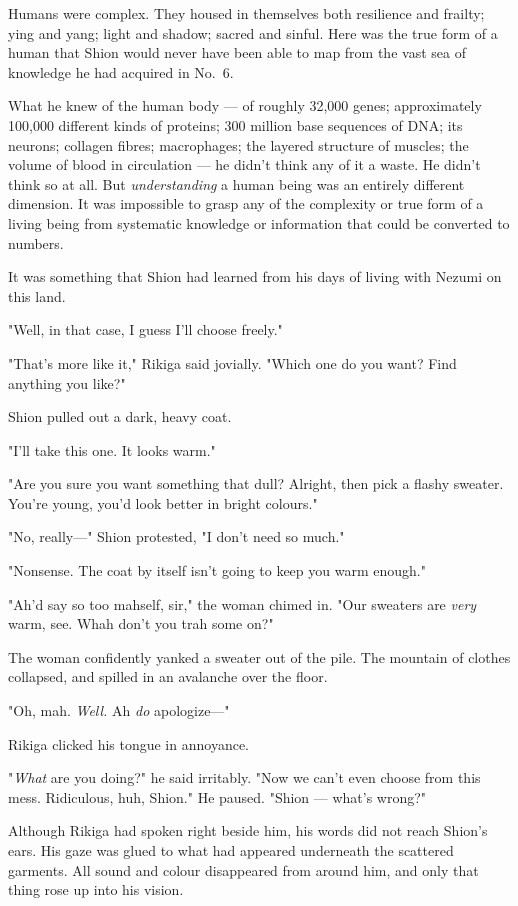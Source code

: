 Humans were complex. They housed in themselves both resilience and
frailty; ying and yang; light and shadow; sacred and sinful. Here was
the true form of a human that Shion would never have been able to map
from the vast sea of knowledge he had acquired in No.~6.

What he knew of the human body --- of roughly 32,000 genes; approximately
100,000 different kinds of proteins; 300 million base sequences of DNA;
its neurons; collagen fibres; macrophages; the layered structure of
muscles; the volume of blood in circulation --- he didn't think any of it
a waste. He didn't think so at all. But \emph{understanding} a human being was
an entirely different dimension. It was impossible to grasp any of the
complexity or true form of a living being from systematic knowledge or
information that could be converted to numbers.

It was something that Shion had learned from his days of living with
Nezumi on this land.

"Well, in that case, I guess I'll choose freely."

"That's more like it," Rikiga said jovially. "Which one do you want?
Find anything you like?"

Shion pulled out a dark, heavy coat.

"I'll take this one. It looks warm."

"Are you sure you want something that dull? Alright, then pick a flashy
sweater. You're young, you'd look better in bright colours."

"No, really---" Shion protested, "I don't need so much."

"Nonsense. The coat by itself isn't going to keep you warm enough."

"Ah'd say so too mahself, sir," the woman chimed in. "Our sweaters are
\emph{very} warm, see. Whah don't you trah some on?"

The woman confidently yanked a sweater out of the pile. The mountain of
clothes collapsed, and spilled in an avalanche over the floor.

"Oh, mah. \emph{Well.} Ah \emph{do} apologize---"

Rikiga clicked his tongue in annoyance.

"\emph{What} are you doing?" he said irritably. "Now we can't even choose from
this mess. Ridiculous, huh, Shion." He paused. "Shion --- what's wrong?"

Although Rikiga had spoken right beside him, his words did not reach
Shion's ears. His gaze was glued to what had appeared underneath the
scattered garments. All sound and colour disappeared from around him,
and only that thing rose up into his vision.

